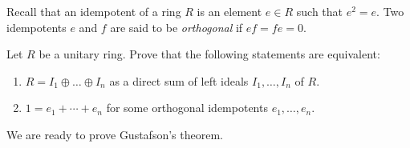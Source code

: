 Recall that an idempotent of a ring $R$ is an element $e\in R$ such that $e^2=e$. Two idempotents 
$e$ and $f$ are said to be \emph{orthogonal} if $ef=fe=0$. 

\begin{exercise}
    \label{xca:idempotents_decomposition}
    Let $R$ be a unitary ring. Prove that the following statements are equivalent: 
    \begin{enumerate}
        \item $R = I_1 \oplus \ldots \oplus I_n$ as a direct sum of left ideals $I_1,\dots,I_n$ of $R$. 
        \item $1=e_1+\cdots+e_n$ for some orthogonal idempotents $e_1,\dots,e_n$.
    \end{enumerate}
\end{exercise}


We are ready to prove Gustafson's theorem. 

